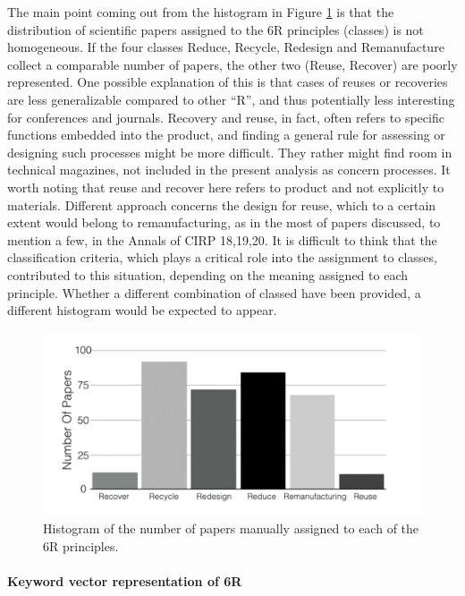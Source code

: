 \documentclass[]{book}
\let\oldparagraph\paragraph
\renewcommand{\paragraph}[1]{\oldparagraph{#1}\mbox{}}
\begin{document}
The main point coming out from the histogram in Figure
\ref{fig:smhistogram} is that the distribution of scientific papers
assigned to the 6R principles (classes) is not homogeneous. If the four
classes Reduce, Recycle, Redesign and Remanufacture collect a comparable
number of papers, the other two (Reuse, Recover) are poorly represented.
One possible explanation of this is that cases of reuses or recoveries
are less generalizable compared to other ``R'', and thus potentially
less interesting for conferences and journals. Recovery and reuse, in
fact, often refers to specific functions embedded into the product, and
finding a general rule for assessing or designing such processes might
be more difficult. They rather might find room in technical magazines,
not included in the present analysis as concern processes. It worth
noting that reuse and recover here refers to product and not explicitly
to materials. Different approach concerns the design for reuse, which to
a certain extent would belong to remanufacturing, as in the most of
papers discussed, to mention a few, in the Annals of CIRP 18,19,20. It
is difficult to think that the classification criteria, which plays a
critical role into the assignment to classes, contributed to this
situation, depending on the meaning assigned to each principle. Whether
a different combination of classed have been provided, a different
histogram would be expected to appear.

\begin{figure}

{\centering \includegraphics[width=0.8\linewidth]{_bookdown_files/figures/sm_histogram} 

}

\caption{Histogram of the number of papers manually assigned to each of the 6R principles.}\label{fig:smhistogram}
\end{figure}

\paragraph{Keyword vector representation of
6R}\label{keyword-vector-representation-of-6r}
\end{document}
